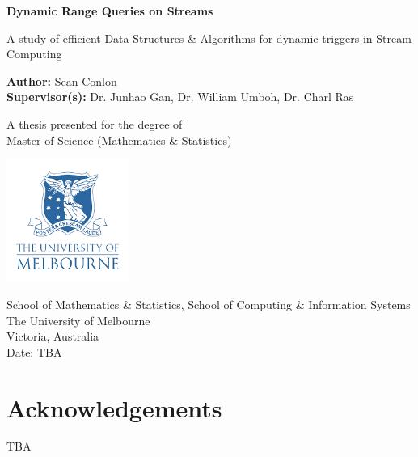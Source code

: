 \documentclass{article}
\begin{document}
\begin{titlepage}
   \begin{center}
       \vspace*{1cm}

       \textbf{Dynamic Range Queries on Streams}

       \vspace{0.5cm}
        A study of efficient Data Structures \& Algorithms for dynamic triggers in Stream Computing
            
       \vspace{1.5cm}

       \textbf{Author:} Sean Conlon \\
       \textbf{Supervisor(s):} Dr. Junhao Gan, Dr. William Umboh, Dr. Charl Ras

       \vfill
            
       A thesis presented for the degree of\\
       Master of Science (Mathematics \& Statistics) 
            
       \vspace{0.8cm}
     
       \includegraphics[width=0.3\textwidth]{images/uomlogo.png}
            
       School of Mathematics \& Statistics, School of Computing \& Information Systems\\
       The University of Melbourne\\
       Victoria, Australia\\
       Date: TBA
            
   \end{center}
\end{titlepage}



\newpage
\section*{Acknowledgements}
TBA



\newpage
\tableofcontents
\thispagestyle{empty}
\clearpage
\setcounter{page}{1}




\newpage
 



\newpage




\newpage





\newpage

\end{document}
